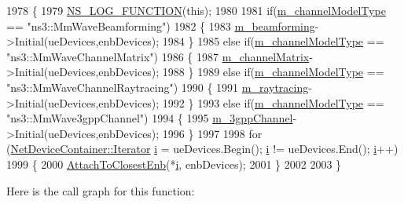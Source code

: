\begin{DoxyCode}
1978 \{
1979         \hyperlink{log-macros-disabled_8h_a90b90d5bad1f39cb1b64923ea94c0761}{NS\_LOG\_FUNCTION}(\textcolor{keyword}{this});
1980 
1981         \textcolor{keywordflow}{if}(\hyperlink{classns3_1_1MmWaveHelper_aec88d691230f0db9448a7f953301bb24}{m\_channelModelType} == \textcolor{stringliteral}{"ns3::MmWaveBeamforming"})
1982         \{
1983                 \hyperlink{classns3_1_1MmWaveHelper_a4fa071b6d755f32a684906150660b381}{m\_beamforming}->Initial(ueDevices,enbDevices);
1984         \}
1985         \textcolor{keywordflow}{else} \textcolor{keywordflow}{if}(\hyperlink{classns3_1_1MmWaveHelper_aec88d691230f0db9448a7f953301bb24}{m\_channelModelType} == \textcolor{stringliteral}{"ns3::MmWaveChannelMatrix"})
1986         \{
1987                 \hyperlink{classns3_1_1MmWaveHelper_a731a9e28a12edacd78b96800025db070}{m\_channelMatrix}->Initial(ueDevices,enbDevices);
1988         \}
1989         \textcolor{keywordflow}{else} \textcolor{keywordflow}{if}(\hyperlink{classns3_1_1MmWaveHelper_aec88d691230f0db9448a7f953301bb24}{m\_channelModelType} == \textcolor{stringliteral}{"ns3::MmWaveChannelRaytracing"})
1990         \{
1991                 \hyperlink{classns3_1_1MmWaveHelper_a99e1ebbb84d122ea60a9fe7c1bb44528}{m\_raytracing}->Initial(ueDevices,enbDevices);
1992         \}
1993         \textcolor{keywordflow}{else} \textcolor{keywordflow}{if}(\hyperlink{classns3_1_1MmWaveHelper_aec88d691230f0db9448a7f953301bb24}{m\_channelModelType} == \textcolor{stringliteral}{"ns3::MmWave3gppChannel"})
1994         \{
1995                 \hyperlink{classns3_1_1MmWaveHelper_a1cbb083568aa048da48260725e3cf4a4}{m\_3gppChannel}->Initial(ueDevices,enbDevices);
1996         \}
1997 
1998         \textcolor{keywordflow}{for} (\hyperlink{classns3_1_1NetDeviceContainer_a45709bb572f975569ed985fa89b132f8}{NetDeviceContainer::Iterator} \hyperlink{bernuolliDistribution_8m_a6f6ccfcf58b31cb6412107d9d5281426}{i} = ueDevices.Begin(); 
      \hyperlink{bernuolliDistribution_8m_a6f6ccfcf58b31cb6412107d9d5281426}{i} != ueDevices.End(); \hyperlink{bernuolliDistribution_8m_a6f6ccfcf58b31cb6412107d9d5281426}{i}++)
1999         \{
2000                 \hyperlink{classns3_1_1MmWaveHelper_a202baea67b0af0d4fb6069de73766dc6}{AttachToClosestEnb}(*\hyperlink{bernuolliDistribution_8m_a6f6ccfcf58b31cb6412107d9d5281426}{i}, enbDevices);
2001         \}
2002 
2003 \}
\end{DoxyCode}


Here is the call graph for this function\+:




